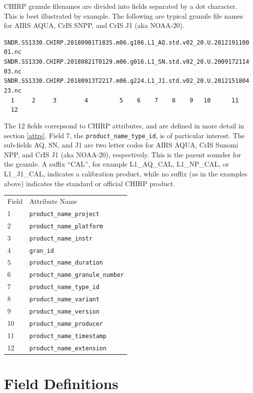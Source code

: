 \documentclass[12pt]{article}
\begin{document}
CHIRP granule filenames are divided into fields separated by a dot
character.  This is best illustrated by example.  The following are
typical granule file names for AIRS AQUA, CrIS SNPP, and CrIS J1
(aka NOAA-20).

\begin{center}
\texttt{SNDR.SS1330.CHIRP.20180901T1835.m06.g186.L1\_AQ.std.v02\_20.U.201219110001.nc} \\
\texttt{SNDR.SS1330.CHIRP.20180821T0129.m06.g016.L1\_SN.std.v02\_20.U.200917211403.nc} \\
\texttt{SNDR.SS1330.CHIRP.20180913T2217.m06.g224.L1\_J1.std.v02\_20.U.201215180423.nc} \\
\texttt{~~1~~~~~2~~~~~3~~~~~~~~4~~~~~~~~~5~~~~6~~~~7~~~~8~~~~9~~~10~~~~~~11~~~~~12} \\
\end{center}

The 12 fields correpsond to CHIRP attributes, and are defined in
more detail in section \ref{attrs}.  Field 7, the
\texttt{product\_name\_type\_id}, is of particular interest.  The
sub-fields AQ, SN, and J1 are two letter codes for AIRS AQUA, CrIS
Sunomi NPP, and CrIS J1 (aka NOAA-20), respectively.  This is the
parent sounder for the granule.  A suffix ``CAL'', for example
L1\_AQ\_CAL, L1\_NP\_CAL, or L1\_J1\_CAL, indicates a calibration
product, while no suffix (as in the examples above) indicates the
standard or official CHIRP product.

\begin{center}
\begin{tabular}{ m{1.4cm} m{10cm} }
  Field & Attribute Name \\
   1 & \texttt{product\_name\_project} \\
   2 & \texttt{product\_name\_platform} \\
   3 & \texttt{product\_name\_instr} \\
   4 & \texttt{gran\_id} \\
   5 & \texttt{product\_name\_duration} \\
   6 & \texttt{product\_name\_granule\_number} \\
   7 & \texttt{product\_name\_type\_id} \\
   8 & \texttt{product\_name\_variant} \\
   9 & \texttt{product\_name\_version} \\
  10 & \texttt{product\_name\_producer} \\
  11 & \texttt{product\_name\_timestamp} \\
  12 & \texttt{product\_name\_extension} \\
\end{tabular}
\end{center}

\section{Field Definitions}


{\scriptsize



}
\end{document}
